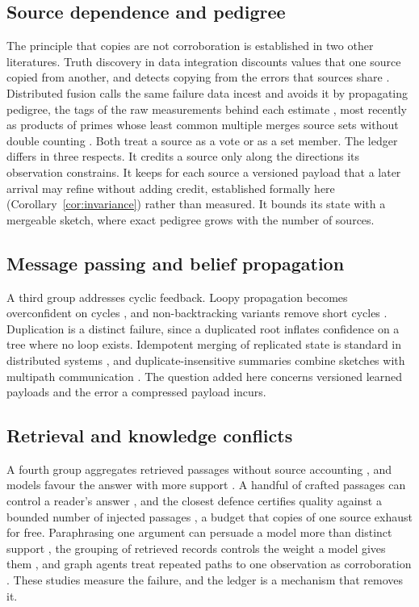 \documentclass{article}
\begin{document}
\subsection{Source dependence and pedigree}
The principle that copies are not corroboration is established in two other
literatures. Truth discovery in data integration discounts values that one
source copied from another, and detects copying from the errors that sources
share \citep{dong2009dependence, dong2009dynamic, dong2010global}. Distributed
fusion calls the same failure data incest and avoids it by propagating pedigree,
the tags of the raw measurements behind each estimate
\citep{arambel2008pedigree}, most recently as products of primes whose least
common multiple merges source sets without double counting
\citep{chang2025primex}. Both treat a source as a vote or as a set member. The
ledger differs in three respects. It credits a source only along the directions
its observation constrains. It keeps for each source a versioned payload that a
later arrival may refine without adding credit, established formally here
(Corollary~\ref{cor:invariance}) rather than measured. It bounds
its state with a mergeable sketch, where exact pedigree grows with the number of
sources.

\subsection{Message passing and belief propagation}
A third group addresses cyclic feedback. Loopy propagation becomes overconfident
on cycles \citep{murphy1999loopy}, and non-backtracking variants remove short
cycles \citep{park2024nba}. Duplication is a distinct failure, since a
duplicated root inflates confidence on a tree where no loop exists. Idempotent
merging of replicated state is standard in distributed systems
\citep{shapiro2011crdt}, and duplicate-insensitive summaries combine sketches
with multipath communication \citep{nath2004synopsis}. The question added here
concerns versioned learned payloads and the error a compressed payload incurs.

\subsection{Retrieval and knowledge conflicts}
A fourth group aggregates retrieved passages without source accounting
\citep{lewis2020rag}, and models favour the answer with more support
\citep{xie2024chameleon}. A handful of crafted passages can control a reader's
answer \citep{zou2025poisonedrag}, and the closest defence certifies quality
against a bounded number of injected passages \citep{xiang2024robustrag}, a
budget that copies of one source exhaust for free. Paraphrasing one argument can
persuade a model more than distinct support \citep{naphade2026rational}, the
grouping of retrieved records controls the weight a model gives them
\citep{liu2026grouping}, and graph agents treat repeated paths to one
observation as corroboration \citep{wang2026graphecho}. These studies measure
the failure, and the ledger is a mechanism that removes it.
\end{document}

